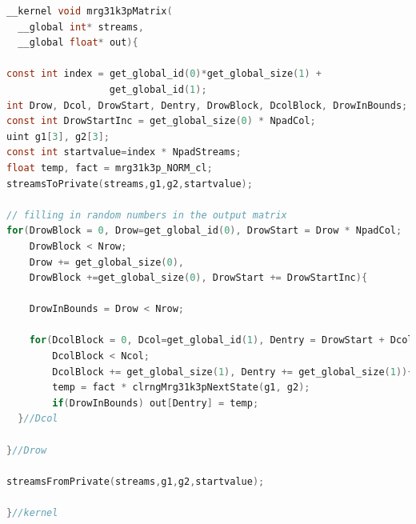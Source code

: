 \documentclass[article,nojss]{jss}\usepackage[]{graphicx}\usepackage[]{color}
\renewcommand{\subfloat}[2][need a sub-caption]{ \subcaptionbox{#1}{#2} }
\begin{document}
\begin{framed}
\begin{lstlisting}[language=C,basicstyle=\small,label={lst:uniformkernel}]
__kernel void mrg31k3pMatrix(
  __global int* streams,
  __global float* out){

const int index = get_global_id(0)*get_global_size(1) + 
                  get_global_id(1);
int Drow, Dcol, DrowStart, Dentry, DrowBlock, DcolBlock, DrowInBounds;
const int DrowStartInc = get_global_size(0) * NpadCol;
uint g1[3], g2[3];
const int startvalue=index * NpadStreams;
float temp, fact = mrg31k3p_NORM_cl;
streamsToPrivate(streams,g1,g2,startvalue);

// filling in random numbers in the output matrix
for(DrowBlock = 0, Drow=get_global_id(0), DrowStart = Drow * NpadCol;
    DrowBlock < Nrow;
    Drow += get_global_size(0), 
    DrowBlock +=get_global_size(0), DrowStart += DrowStartInc){
    
    DrowInBounds = Drow < Nrow;
    
    for(DcolBlock = 0, Dcol=get_global_id(1), Dentry = DrowStart + Dcol;
        DcolBlock < Ncol;
        DcolBlock += get_global_size(1), Dentry += get_global_size(1)){
        temp = fact * clrngMrg31k3pNextState(g1, g2);
        if(DrowInBounds) out[Dentry] = temp;
  }//Dcol
  
}//Drow

streamsFromPrivate(streams,g1,g2,startvalue);

}//kernel
\end{lstlisting}
\end{framed}
\end{document}

